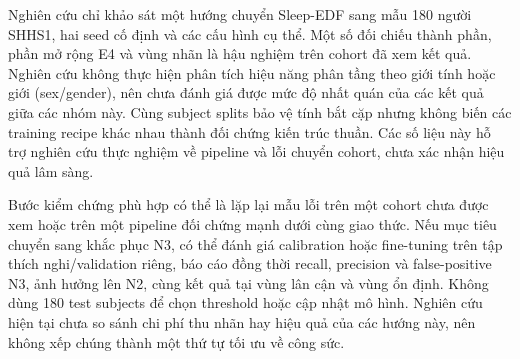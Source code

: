 Nghiên cứu chỉ khảo sát một hướng chuyển Sleep-EDF sang mẫu 180 người SHHS1, hai seed cố định và các cấu hình cụ thể. Một số đối chiếu thành phần, phần mở rộng E4 và vùng nhãn là hậu nghiệm trên cohort đã xem kết quả. Nghiên cứu không thực hiện phân tích hiệu năng phân tầng theo giới tính hoặc giới (sex/gender), nên chưa đánh giá được mức độ nhất quán của các kết quả giữa các nhóm này. Cùng subject splits bảo vệ tính bắt cặp nhưng không biến các training recipe khác nhau thành đối chứng kiến trúc thuần. Các số liệu này hỗ trợ nghiên cứu thực nghiệm về pipeline và lỗi chuyển cohort, chưa xác nhận hiệu quả lâm sàng.

Bước kiểm chứng phù hợp có thể là lặp lại mẫu lỗi trên một cohort chưa được xem hoặc trên một pipeline đối chứng mạnh dưới cùng giao thức. Nếu mục tiêu chuyển sang khắc phục N3, có thể đánh giá calibration hoặc fine-tuning trên tập thích nghi/validation riêng, báo cáo đồng thời recall, precision và false-positive N3, ảnh hưởng lên N2, cùng kết quả tại vùng lân cận và vùng ổn định. Không dùng 180 test subjects để chọn threshold hoặc cập nhật mô hình. Nghiên cứu hiện tại chưa so sánh chi phí thu nhãn hay hiệu quả của các hướng này, nên không xếp chúng thành một thứ tự tối ưu về công sức.
